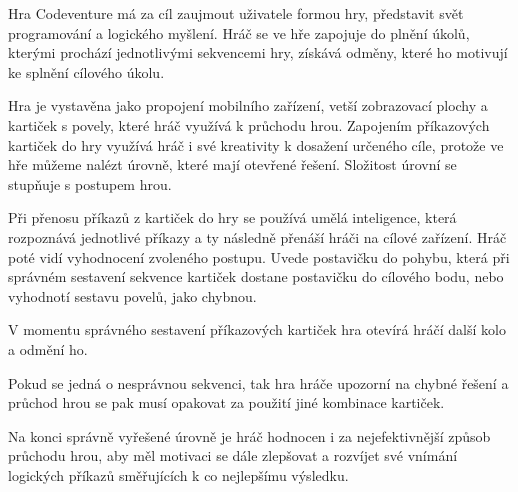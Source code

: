 Hra Codeventure má za cíl zaujmout uživatele formou hry, představit svět programování a logického myšlení. Hráč se ve hře zapojuje do plnění úkolů, kterými prochází jednotlivými sekvencemi hry, získává odměny, které ho motivují ke splnění cílového úkolu.\par Hra je vystavěna jako propojení mobilního zařízení, vetší zobrazovací plochy a kartiček s povely, které hráč využívá k průchodu hrou. Zapojením příkazových kartiček do hry využívá hráč i své kreativity k dosažení určeného cíle, protože ve hře můžeme nalézt úrovně, které mají otevřené řešení. Složitost úrovní se stupňuje s postupem hrou.\par Při přenosu příkazů z kartiček do hry se používá umělá inteligence, která rozpoznává jednotlivé příkazy a ty následně přenáší hráči na cílové zařízení. Hráč poté vidí vyhodnocení zvoleného postupu. Uvede postavičku do pohybu, která při správném sestavení sekvence kartiček dostane postavičku do cílového bodu, nebo vyhodnotí sestavu povelů, jako chybnou.\par
V momentu správného sestavení příkazových kartiček hra otevírá hráčí další kolo a odmění ho.\par Pokud se jedná o nesprávnou sekvenci, tak hra hráče upozorní na chybné řešení a průchod hrou se pak musí opakovat za použití jiné kombinace kartiček.\par Na konci správně vyřešené úrovně je hráč hodnocen i za nejefektivnější způsob průchodu hrou, aby měl motivaci se dále zlepšovat a rozvíjet své vnímání logických příkazů směřujících k co nejlepšímu výsledku.